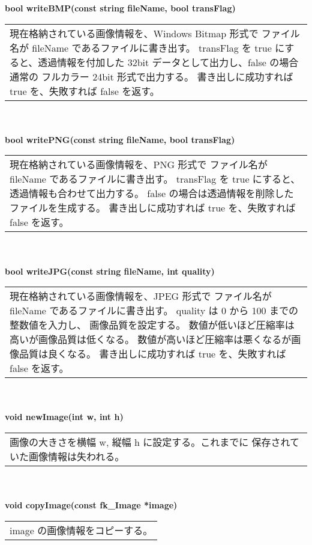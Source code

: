 \begin{tabbing}
\> \textbf{bool writeBMP(const string fileName, bool transFlag)} \\
	\> \> \begin{tabular}{p{15cm}}
		現在格納されている画像情報を、Windows Bitmap 形式で
		ファイル名が fileName であるファイルに書き出す。
		transFlag を true にすると、透過情報を付加した
		32bit データとして出力し、false の場合通常の
		フルカラー 24bit 形式で出力する。
		書き出しに成功すれば true を、失敗すれば false を返す。
	\end{tabular} \\ \\

\> \textbf{bool writePNG(const string fileName, bool transFlag)} \\
	\> \> \begin{tabular}{p{15cm}}
		現在格納されている画像情報を、PNG 形式で
		ファイル名が fileName であるファイルに書き出す。
		transFlag を true にすると、透過情報も合わせて出力する。
		false の場合は透過情報を削除したファイルを生成する。
		書き出しに成功すれば true を、失敗すれば false を返す。
	\end{tabular} \\ \\

\> \textbf{bool writeJPG(const string fileName, int quality)} \\
	\> \> \begin{tabular}{p{15cm}}
		現在格納されている画像情報を、JPEG 形式で
		ファイル名が fileName であるファイルに書き出す。
		quality は 0 から 100 までの整数値を入力し、
		画像品質を設定する。
		数値が低いほど圧縮率は高いが画像品質は低くなる。
		数値が高いほど圧縮率は悪くなるが画像品質は良くなる。
		書き出しに成功すれば true を、失敗すれば false を返す。
	\end{tabular} \\ \\

\> \textbf{void newImage(int w, int h)} \\
	\> \> \begin{tabular}{p{15cm}}
		画像の大きさを横幅 w, 縦幅 h に設定する。これまでに
		保存されていた画像情報は失われる。
	\end{tabular} \\ \\

\> \textbf{void copyImage(const fk\_Image *image)} \\
	\> \> \begin{tabular}{p{15cm}}
		image の画像情報をコピーする。
	\end{tabular} \\ \\


\end{tabbing}
